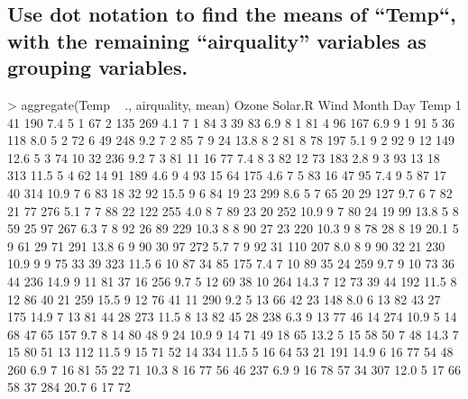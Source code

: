 \documentclass[a4paper,11pt]{article}
\begin{document}
\subsection{Use dot notation to find the means of “Temp“, with the remaining “airquality” variables as grouping variables.}
\begin{rcode}
> aggregate(Temp ~ ., airquality, mean)
    Ozone Solar.R Wind Month Day Temp
1      41     190  7.4     5   1   67
2     135     269  4.1     7   1   84
3      39      83  6.9     8   1   81
4      96     167  6.9     9   1   91
5      36     118  8.0     5   2   72
6      49     248  9.2     7   2   85
7       9      24 13.8     8   2   81
8      78     197  5.1     9   2   92
9      12     149 12.6     5   3   74
10     32     236  9.2     7   3   81
11     16      77  7.4     8   3   82
12     73     183  2.8     9   3   93
13     18     313 11.5     5   4   62
14     91     189  4.6     9   4   93
15     64     175  4.6     7   5   83
16     47      95  7.4     9   5   87
17     40     314 10.9     7   6   83
18     32      92 15.5     9   6   84
19     23     299  8.6     5   7   65
20     29     127  9.7     6   7   82
21     77     276  5.1     7   7   88
22    122     255  4.0     8   7   89
23     20     252 10.9     9   7   80
24     19      99 13.8     5   8   59
25     97     267  6.3     7   8   92
26     89     229 10.3     8   8   90
27     23     220 10.3     9   8   78
28      8      19 20.1     5   9   61
29     71     291 13.8     6   9   90
30     97     272  5.7     7   9   92
31    110     207  8.0     8   9   90
32     21     230 10.9     9   9   75
33     39     323 11.5     6  10   87
34     85     175  7.4     7  10   89
35     24     259  9.7     9  10   73
36     44     236 14.9     9  11   81
37     16     256  9.7     5  12   69
38     10     264 14.3     7  12   73
39     44     192 11.5     8  12   86
40     21     259 15.5     9  12   76
41     11     290  9.2     5  13   66
42     23     148  8.0     6  13   82
43     27     175 14.9     7  13   81
44     28     273 11.5     8  13   82
45     28     238  6.3     9  13   77
46     14     274 10.9     5  14   68
47     65     157  9.7     8  14   80
48      9      24 10.9     9  14   71
49     18      65 13.2     5  15   58
50      7      48 14.3     7  15   80
51     13     112 11.5     9  15   71
52     14     334 11.5     5  16   64
53     21     191 14.9     6  16   77
54     48     260  6.9     7  16   81
55     22      71 10.3     8  16   77
56     46     237  6.9     9  16   78
57     34     307 12.0     5  17   66
58     37     284 20.7     6  17   72

\end{rcode}
\end{document}
